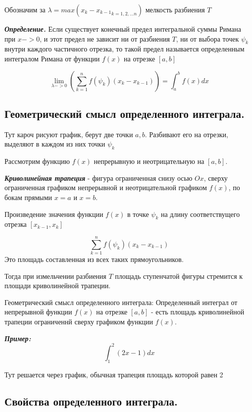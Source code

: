 \documentclass[a4paper,12pt]{article}
\theoremstyle{plain} %
\theoremstyle{definition} %
\theoremstyle{remark} %
\begin{document}
Обозначим за $\lambda = max({x_k - x_{k-1}}_{k = 1, 2, ...n})$ мелкость разбиения $T$

\textit{\textbf{Определение.}} Если существует конечный предел интегральной суммы Римана при $x -> 0$, и этот предел не зависит ни от разбиения $T$, ни от выбора точек $\psi_k$ внутри каждого частичного отрезка, то такой предел называется определенным интегралом Римана от функции $f(x)$ на отрезке $[a, b]$

\[
	\lim_{\lambda -> 0} \left( \sum_{k = 1}^nf(\psi_k)(x_k - x_{k-1}) \right) =
	\int_a^b f(x) dx
\]

\newpage
\subsection*{Геометрический смысл определенного интеграла.                                                }

Тут кароч рисуют график, берут две точки $a, b$. Разбивают его на отрезки, выделяют в каждом из них точки $\psi_k$

Рассмотрим функцию $f(x)$ непрерывную и неотрицательную на $[a, b]$.

\textit{\textbf{Криволинейная трапеция}} - фигура ограниченная снизу осью $Ox$, сверху ограниченная графиком непрерывной и неотрицательной графиком $f(x)$, по бокам прямыми $x = a$ и $x = b$.

Произведение значения функции $f(x)$ в точке $\psi_k$ на длину соответствущего отрезка $[x_{k-1}, x_k]$

\[
	\sum_{k = 1}^n f(\psi_k)(x_k - x_{k-1})
\]
Это площадь составленная из всех таких прямоугольников.

Тогда при измельчении разбиения $T$ площадь ступенчатой фигуры стремится к площади криволинейной трапеции.

Геометрический смысл определенного интеграла:
Определенный интеграл от непрерывной функции $f(x)$ на отрезке $[a, b]$ - есть площадь криволинейной трапеции ограниченнй сверху графиком функции $f(x)$.

\textit{\textbf{Пример:}}
\[
	\int_1^2 (2x - 1) dx
\]

Тут решается через график, обычная трапеция площадь которой равен 2

\newpage
\subsection*{Свойства определенного интеграла.                                                            }
\end{document}
